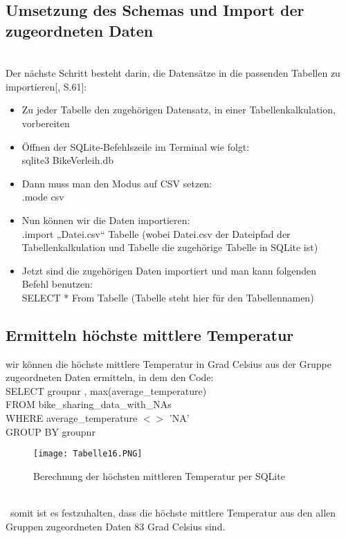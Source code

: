 \documentclass[1pt]{article}
\begin{document}
\subsection{Umsetzung des Schemas  und Import der zugeordneten Daten}\\
\label{Umsetzung des Schemas  und Import der zugeordneten Daten}
Der nächste Schritt besteht darin, die Datensätze in die passenden Tabellen zu importieren[\cite{SQLite}, S.61]:
\begin{itemize}
\item Zu jeder Tabelle den zugehörigen Datensatz, in einer Tabellenkalkulation, vorbereiten
\item Öffnen der SQLite-Befehlszeile im Terminal wie folgt:\\
sqlite3 BikeVerleih.db
\item Dann muss man den Modus auf CSV setzen:\\
         .mode csv            
\item Nun können wir die Daten importieren:\\
.import „Datei.csv“ Tabelle (wobei Datei.csv der Dateipfad der 
Tabellenkalkulation und Tabelle die zugehörige Tabelle in SQLite ist)

\item Jetzt sind die zugehörigen Daten importiert und man kann folgenden\\ Befehl benutzen:\\
SELECT * From Tabelle (Tabelle steht hier für den Tabellennamen)
\end{itemize}

\newpage
\subsection{Ermitteln höchste mittlere Temperatur}

wir können die höchste mittlere Temperatur in Grad Celsius aus der Gruppe zugeordneten Daten ermitteln, in dem den Code:\\

SELECT groupnr , max(average\_temperature)\\
FROM bike\_sharing\_data\_with\_NAs\\
WHERE average\_temperature $<>$ 'NA'\\
GROUP BY groupnr


\begin{figure}[h] %
    \centering %
    \texttt{[image: Tabelle16.PNG]} %
    \caption{Berechnung der höchsten mittleren Temperatur per SQLite}
   \label{fig:meinBild} %
\end{figure}\\
\ somit ist es festzuhalten, dass die höchste mittlere Temperatur aus den
allen Gruppen zugeordneten Daten  83 Grad Celsius sind.\\


\printbibliography
\end{document}
